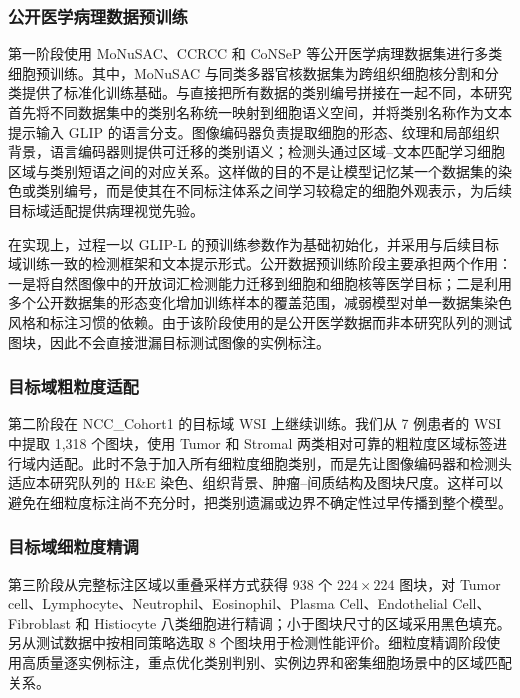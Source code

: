 \subsubsection{公开医学病理数据预训练}
第一阶段使用 MoNuSAC、CCRCC 和 CoNSeP 等公开医学病理数据集进行多类细胞预训练。其中，MoNuSAC 与同类多器官核数据集为跨组织细胞核分割和分类提供了标准化训练基础\cite{verma2021monusac,gamper2019pannuke,graham2021lizard}。与直接把所有数据的类别编号拼接在一起不同，本研究首先将不同数据集中的类别名称统一映射到细胞语义空间，并将类别名称作为文本提示输入 GLIP 的语言分支。图像编码器负责提取细胞的形态、纹理和局部组织背景，语言编码器则提供可迁移的类别语义；检测头通过区域--文本匹配学习细胞区域与类别短语之间的对应关系。这样做的目的不是让模型记忆某一个数据集的染色或类别编号，而是使其在不同标注体系之间学习较稳定的细胞外观表示，为后续目标域适配提供病理视觉先验。

在实现上，过程一以 GLIP-L 的预训练参数作为基础初始化，并采用与后续目标域训练一致的检测框架和文本提示形式。公开数据预训练阶段主要承担两个作用：一是将自然图像中的开放词汇检测能力迁移到细胞和细胞核等医学目标；二是利用多个公开数据集的形态变化增加训练样本的覆盖范围，减弱模型对单一数据集染色风格和标注习惯的依赖。由于该阶段使用的是公开医学数据而非本研究队列的测试图块，因此不会直接泄漏目标测试图像的实例标注。

\subsubsection{目标域粗粒度适配}
第二阶段在 NCC\_Cohort1 的目标域 WSI 上继续训练。我们从 7 例患者的 WSI 中提取 1,318 个图块，使用 Tumor 和 Stromal 两类相对可靠的粗粒度区域标签进行域内适配。此时不急于加入所有细粒度细胞类别，而是先让图像编码器和检测头适应本研究队列的 H\&E 染色、组织背景、肿瘤--间质结构及图块尺度。这样可以避免在细粒度标注尚不充分时，把类别遗漏或边界不确定性过早传播到整个模型。

\subsubsection{目标域细粒度精调}
第三阶段从完整标注区域以重叠采样方式获得 938 个 $224\times224$ 图块，对 Tumor cell、Lymphocyte、Neutrophil、Eosinophil、Plasma Cell、Endothelial Cell、Fibroblast 和 Histiocyte 八类细胞进行精调；小于图块尺寸的区域采用黑色填充。另从测试数据中按相同策略选取 8 个图块用于检测性能评价。细粒度精调阶段使用高质量逐实例标注，重点优化类别判别、实例边界和密集细胞场景中的区域匹配关系。

